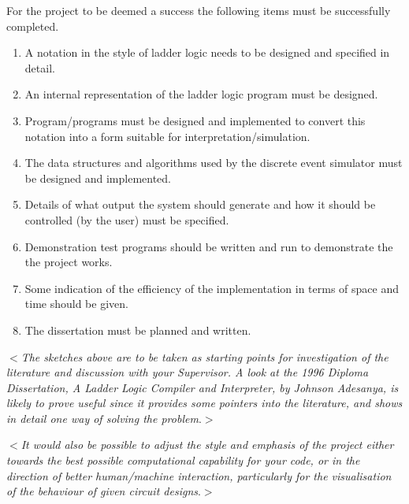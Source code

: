 \documentclass[12pt]{article}
\newcommand{\al}{$<$}
\newcommand{\ar}{$>$}
\begin{document}
For the project to be deemed a success the following items must be
successfully completed.

\begin{enumerate}

\item A notation in the style of ladder logic needs to be designed and
  specified in detail.

\item An internal representation of the ladder logic program must be
  designed.

\item Program/programs must be designed and implemented to convert
  this notation into a form suitable for interpretation/simulation.

\item The data structures and algorithms used by the discrete event simulator
must be designed and implemented.

\item Details of what output the system should generate and how it
  should be controlled (by the user) must be specified.

\item Demonstration test programs should be written and run to
  demonstrate the the project works.

\item Some indication of the efficiency of the implementation in terms
  of space and time should be given.

\item The dissertation must be planned and written.

\end{enumerate}

\al\emph{The sketches above are to be taken as starting points for
  investigation of the literature and discussion with your Supervisor.
  A look at the 1996 Diploma Dissertation, {\rm A Ladder Logic
    Compiler and Interpreter}, by Johnson Adesanya, is likely to prove
  useful since it provides some pointers into the literature, and
  shows in detail one way of solving the problem}.\ar

\medskip \al\emph{It would also be possible to adjust the style and
  emphasis of the project either towards the best possible
  computational capability for your code, or in the direction of
  better human/machine interaction, particularly for the visualisation
  of the behaviour of given circuit designs}.\ar
\end{document}
